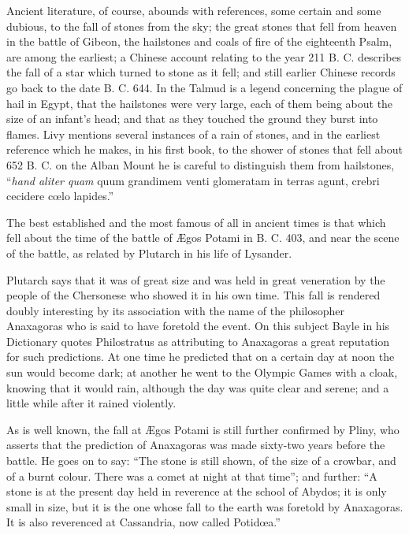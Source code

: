 \documentclass[a4paper, 11pt, oneside]{article}
\begin{document}
Ancient literature, of course, abounds with references, some certain and some dubious, to the fall of stones from the sky; the great stones that fell from heaven in the battle of Gibeon, the hailstones and coals of fire of the eighteenth Psalm, are among the earliest; a Chinese account relating to the year 211 B. C. describes the fall of a star which turned to stone as it fell; and still earlier Chinese records go back to the date B. C. 644. In the Talmud is a legend concerning the plague of hail in Egypt, that the hailstones were very large, each of them being about the size of an infant's head; and that as they touched the ground they burst into flames. Livy mentions several instances of a rain of stones, and in the earliest reference which he makes, in his first book, to the shower of stones that fell about 652 B. C. on the Alban Mount he is careful to distinguish them from hailstones, ``\emph{hand aliter quam} quum grandimem venti glomeratam in terras agunt, crebri cecidere cœlo lapides.'' 

The best established and the most famous of all in ancient times is that which fell about the time of the battle of Ægos Potami in B. C. 403, and near the scene of the battle, as related by Plutarch in his life of Lysander. 

Plutarch says that it was of great size and was held in great veneration by the people of the Chersonese who showed it in his own time. This fall is rendered doubly interesting by its association with the name of the philosopher Anaxagoras who is said to have foretold the event. On this subject Bayle in his Dictionary quotes Philostratus as attributing to Anaxagoras a great reputation for such predictions. At one time he predicted that on a certain day at noon the sun would become dark; at another he went to the Olympic Games with a cloak, knowing that it would rain, although the day was quite clear and serene; and a little while after it rained violently. 

As is well known, the fall at Ægos Potami is still further confirmed by Pliny, who asserts that the prediction of Anaxagoras was made sixty-two years before the battle. He goes on to say: ``The stone is still shown, of the size of a crowbar, and of a burnt colour. There was a comet at night at that time''; and further: ``A stone is at the present day held in reverence at the school of Abydos; it is only small in size, but it is the one whose fall to the earth was foretold by Anaxagoras. It is also reverenced at Cassandria, now called Potidœa.''
\end{document}
